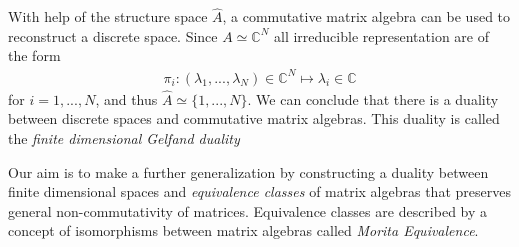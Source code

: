 With help of the structure space $\hat{A}$, a commutative matrix algebra can be used to reconstruct a discrete space.
Since $A \simeq \mathbb{C}^N$ all irreducible representation are of the form
\begin{align}
   \pi _i:(\lambda_1,...,\lambda_N)\in \mathbb{C}^N \mapsto \lambda_i \in
   \mathbb{C}
\end{align}
for $i = 1,...,N$, and thus $\hat{A} \simeq \{1,...,N\}$.
We can conclude that there is a duality between discrete spaces and
commutative matrix algebras. This duality is called the \textit{finite
dimensional Gelfand duality}

Our aim is to make a further generalization by constructing a duality between
finite dimensional spaces and \textit{equivalence classes} of matrix
algebras that preserves general non-commutativity of matrices. Equivalence
classes are described by a concept of isomorphisms between matrix
algebras called \textit{Morita Equivalence}.

